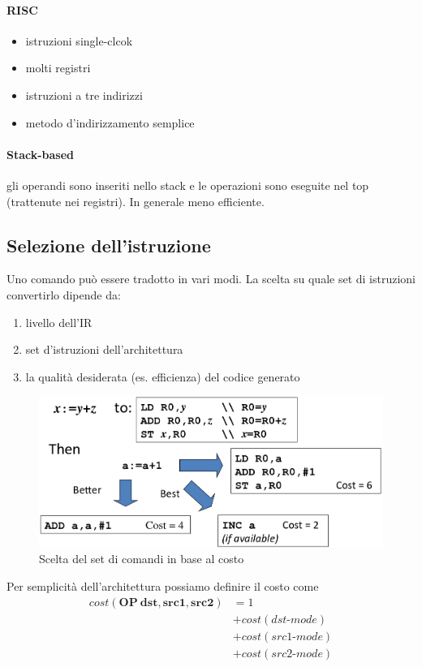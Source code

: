 \paragraph{RISC}
\begin{itemize}
\item istruzioni single-clcok
\item molti registri
\item istruzioni a tre indirizzi
\item metodo d'indirizzamento semplice
\end{itemize}
\paragraph{Stack-based}
gli operandi sono inseriti nello stack e le operazioni sono eseguite nel top
(trattenute nei registri). In generale meno efficiente.

\subsection{Selezione dell'istruzione}
Uno comando pu\`o essere tradotto in vari modi. La scelta su quale set di
istruzioni convertirlo dipende da:
\begin{enumerate}
\item livello dell'IR
\item set d'istruzioni dell'architettura
\item la qualit\`a desiderata (es. efficienza) del codice generato
\end{enumerate}

\begin{figure}[H]
  \centering
  \includegraphics[scale=0.35]{res/image/choice_cost}
  \caption{Scelta del set di comandi in base al costo}
  \label{img:choice_cost}
\end{figure}

Per semplicit\`a dell'architettura possiamo definire il costo come
\begin{align*}
cost(\mathbf{OP \ dst}, \mathbf{src1}, \mathbf{src2})
&= 1 \\
&+ cost(dst\text{-}mode) \\
&+ cost(src1\text{-}mode) \\
&+ cost(src2\text{-}mode)
\end{align*}

